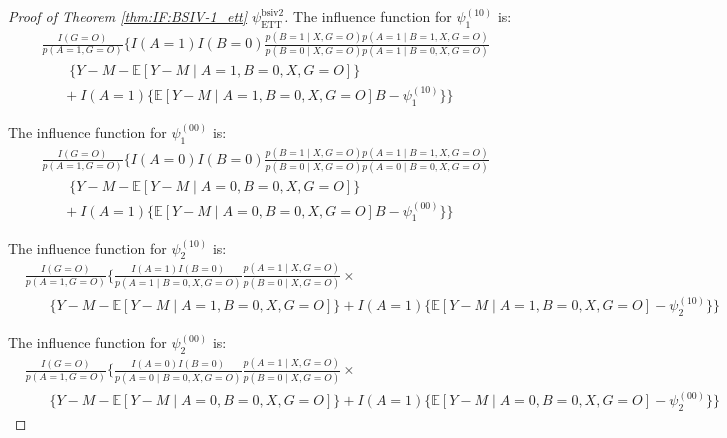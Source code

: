 \documentclass[10pt]{article}
\begin{document}
\begin{proof}[Proof of Theorem \ref{thm:IF:BSIV-1_ett} $\psi_{\text{ETT}}^{\text{bsiv2}}$]
The influence function for $\psi_1^{(10)}$ is:
\begin{align*}
    &\frac{I(G=O)}{p(A=1,G=O)}\bigg\{I(A=1)I(B=0)\frac{p(B=1\mid X,G=O)p(A=1\mid B=1, X, G=O)}{p(B=0\mid X,G=O)p(A=1\mid B=0, X,G=O)}\\
    &\ \ \ \ \ \ \ \ \ \{Y-M-\mathbb{E}[Y-M\mid A=1,B=0,X,G=O]\}\\
    &\ \ \ \ \ \ \ +I(A=1)\{\mathbb{E}[Y-M\mid A=1,B=0,X,G=O]B-\psi_1^{(10)}\}\bigg\}
\end{align*}

The influence function for $\psi_1^{(00)}$ is:
\begin{align*}
    &\frac{I(G=O)}{p(A=1,G=O)}\bigg\{I(A=0)I(B=0)\frac{p(B=1\mid X,G=O)p(A=1\mid B=1, X, G=O)}{p(B=0\mid X,G=O)p(A=0\mid B=0, X,G=O)}\\
    &\ \ \ \ \ \ \ \ \ \{Y-M-\mathbb{E}[Y-M\mid A=0,B=0,X,G=O]\}\\
    &\ \ \ \ \ \ \ +I(A=1)\{\mathbb{E}[Y-M\mid A=0,B=0,X,G=O]B-\psi_1^{(00)}\}\bigg\}
\end{align*}

The influence function for $\psi_2^{(10)}$ is:
{\footnotesize \begin{align*}
    &\frac{I(G=O)}{p(A=1, G=O)}\bigg\{\frac{I(A=1)I(B=0)}{p(A=1\mid B=0,X,G=O)}\frac{p(A=1\mid X, G=O)}{p(B=0\mid X,G=O)}\times\\
    &\ \ \ \ \ \ \ \ \{Y-M-\mathbb{E}[Y-M\mid A=1,B=0,X,G=O]\}+I(A=1)\{\mathbb{E}[Y-M\mid A=1,B=0,X,G=O]-\psi_2^{(10)}\}\bigg\}
\end{align*}}

The influence function for $\psi_2^{(00)}$ is:
{\footnotesize \begin{align*}
    &\frac{I(G=O)}{p(A=1, G=O)}\bigg\{\frac{I(A=0)I(B=0)}{p(A=0\mid B=0,X,G=O)}\frac{p(A=1\mid X, G=O)}{p(B=0\mid X,G=O)}\times\\
    &\ \ \ \ \ \ \ \ \{Y-M-\mathbb{E}[Y-M\mid A=0,B=0,X,G=O]\}+I(A=1)\{\mathbb{E}[Y-M\mid A=0,B=0,X,G=O]-\psi_2^{(00)}\}\bigg\}
\end{align*}}


\end{proof}
\end{document}
